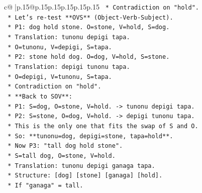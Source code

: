 \documentclass{article}
\begin{document}
{\begin{supertabular}{c@{$\;$}|p{.15\linewidth}@{}p{.15\linewidth}p{.15\linewidth}p{.15\linewidth}p{.15\linewidth}p{.15\linewidth}}
{{{\texttt{                                            *   Contradiction on "hold".} \\
\texttt{                                        *   Let's re{-}test **OVS** (Object{-}Verb{-}Subject).} \\
\texttt{                                            *   P1: dog hold stone. O=stone, V=hold, S=dog.} \\
\texttt{                                            *   Translation: tunonu depigi tapa.} \\
\texttt{                                            *   O=tunonu, V=depigi, S=tapa.} \\
\texttt{                                            *   P2: stone hold dog. O=dog, V=hold, S=stone.} \\
\texttt{                                            *   Translation: depigi tunonu tapa.} \\
\texttt{                                            *   O=depigi, V=tunonu, S=tapa.} \\
\texttt{                                            *   Contradiction on "hold".} \\
\texttt{                                        *   **Back to SOV**:} \\
\texttt{                                            *   P1: S=dog, O=stone, V=hold. {-}> tunonu depigi tapa.} \\
\texttt{                                            *   P2: S=stone, O=dog, V=hold. {-}> depigi tunonu tapa.} \\
\texttt{                                            *   This is the only one that fits the swap of S and O.} \\
\texttt{                                            *   So: **tunonu=dog, depigi=stone, tapa=hold**.} \\
\texttt{                                            *   Now P3: "tall dog hold stone".} \\
\texttt{                                            *   S=tall dog, O=stone, V=hold.} \\
\texttt{                                            *   Translation: tunonu depigi ganaga tapa.} \\
\texttt{                                            *   Structure: {[}dog{]} {[}stone{]} {[}ganaga{]} {[}hold{]}.} \\
\texttt{                                            *   If "ganaga" = tall.} \\
}}}
\end{supertabular}}
\end{document}
